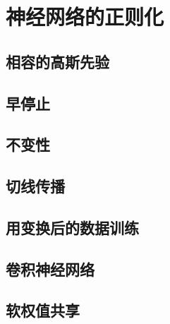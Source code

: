 \section{神经网络的正则化}
\subsection*{相容的高斯先验}
\subsection*{早停止}
\subsection*{不变性}
\subsection*{切线传播}
\subsection*{用变换后的数据训练}
\subsection*{卷积神经网络}
\subsection*{软权值共享}